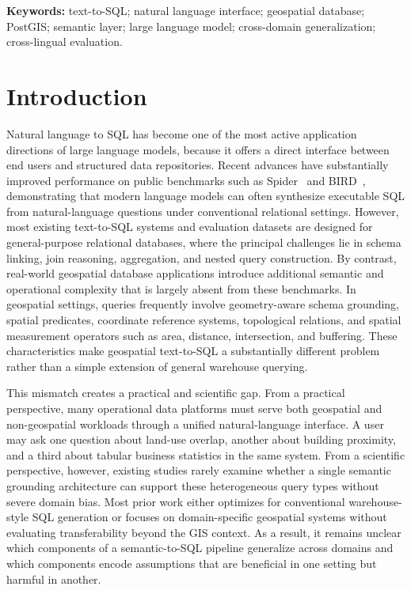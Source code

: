 \documentclass[11pt]{article}
\begin{document}
\begin{abstract}
\end{abstract}

\noindent\textbf{Keywords:} text-to-SQL; natural language interface; geospatial database; PostGIS; semantic layer; large language model; cross-domain generalization; cross-lingual evaluation.

\section{Introduction}
\label{sec:intro}

Natural language to SQL has become one of the most active application directions of large language models, because it offers a direct interface between end users and structured data repositories. Recent advances have substantially improved performance on public benchmarks such as Spider~\cite{yu2018spider} and BIRD~\cite{li2023bird}, demonstrating that modern language models can often synthesize executable SQL from natural-language questions under conventional relational settings. However, most existing text-to-SQL systems and evaluation datasets are designed for general-purpose relational databases, where the principal challenges lie in schema linking, join reasoning, aggregation, and nested query construction. By contrast, real-world geospatial database applications introduce additional semantic and operational complexity that is largely absent from these benchmarks. In geospatial settings, queries frequently involve geometry-aware schema grounding, spatial predicates, coordinate reference systems, topological relations, and spatial measurement operators such as area, distance, intersection, and buffering. These characteristics make geospatial text-to-SQL a substantially different problem rather than a simple extension of general warehouse querying.

This mismatch creates a practical and scientific gap. From a practical perspective, many operational data platforms must serve both geospatial and non-geospatial workloads through a unified natural-language interface. A user may ask one question about land-use overlap, another about building proximity, and a third about tabular business statistics in the same system. From a scientific perspective, however, existing studies rarely examine whether a single semantic grounding architecture can support these heterogeneous query types without severe domain bias. Most prior work either optimizes for conventional warehouse-style SQL generation or focuses on domain-specific geospatial systems without evaluating transferability beyond the GIS context. As a result, it remains unclear which components of a semantic-to-SQL pipeline generalize across domains and which components encode assumptions that are beneficial in one setting but harmful in another.
\end{document}
